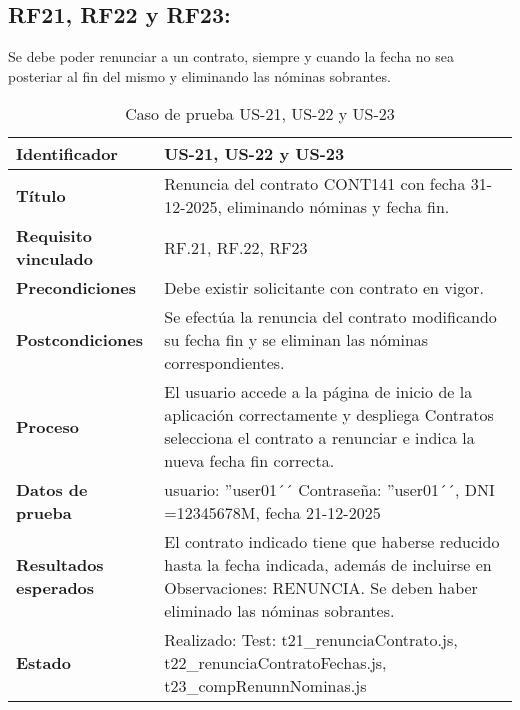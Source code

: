 \subsection{RF21, RF22 y RF23:} Se debe poder renunciar a un contrato, siempre y cuando la fecha no sea posteriar al fin del mismo y eliminando las nóminas sobrantes.
\begin{table}[H]
	\centering
	\renewcommand{\arraystretch}{1.3} 
	\begin{tabularx}{\textwidth}{|l|X|}
		\hline
		\textbf{Identificador} & US-21, US-22 y US-23 \\
		\hline
		\textbf{Título} &Renuncia del contrato CONT141 con fecha 31-12-2025, eliminando nóminas y fecha fin.	\\
		\hline
		\textbf{Requisito vinculado} & RF.21, RF.22, RF23 \\
		\hline
		\textbf{Precondiciones} & Debe existir solicitante con contrato en vigor.\\
		\hline
		\textbf{Postcondiciones} & Se efectúa la renuncia del contrato modificando su fecha fin y se eliminan las nóminas correspondientes. \\
		\hline
		\textbf{Proceso} & El usuario accede a la página de inicio de la aplicación correctamente y despliega Contratos selecciona el contrato a renunciar e indica la nueva fecha fin correcta. \\
		\hline
		\textbf{Datos de prueba} & usuario: ''user01´´ Contraseña: ''user01´´, DNI =12345678M, fecha 21-12-2025 \\
		\hline
		\textbf{Resultados esperados} & El contrato indicado tiene que haberse reducido hasta la fecha indicada, además de incluirse en Observaciones: RENUNCIA. Se deben haber eliminado las nóminas sobrantes. \\
		\hline
		\textbf{Estado} & Realizado: Test: t21\_renunciaContrato.js, t22\_renunciaContratoFechas.js, t23\_compRenunnNominas.js \\
		\hline
	\end{tabularx}
	\caption{Caso de prueba US-21, US-22 y US-23}
	\label{tab:caso_uso21}
\end{table}

